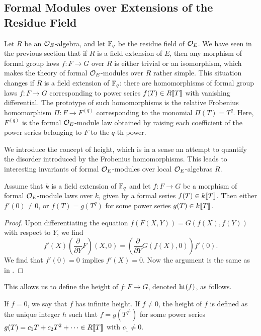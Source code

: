 \documentclass[../main.tex]{subfiles}
\begin{document}

\subsection{Formal Modules over Extensions of the Residue Field} %
\label{sub:Formal DVR-Modules over Fields}
Let $R$ be an $\mathcal{O}_E$-algebra, and let 
$\mathbb{F}_q$ be the residue field of $\mathcal{O}_E$. We have seen in the previous section
that if $R$ is a field extension of $E$,
then any morphism of formal group laws $f\colon  F \to G$ over $R$ is either trivial
or an isomorphism, which makes the theory of formal $\mathcal{O}_E$-modules over $R$ rather
simple. This situation changes if $R$ is a field extension of $\mathbb{F}_q$: there are
homomorphisms of formal group laws $f\colon F \to G$ corresponding to power
series $f(T) \in R \llbracket T \rrbracket$ with vanishing differential. The prototype of
such homomorphisms is the relative Frobenius homomorphism $\Pi \colon F \to
F^{(q)}$ corresponding to the monomial $\Pi(T) = T^q$. Here, $F^{(q)}$ is the
formal $\mathcal{O}_E$-module law obtained by raising each coefficient of the power series
belonging to $F$ to the $q$-th power.

We introduce the concept of height, which is in a sense an attempt to quantify
the disorder introduced by the Frobenius homomorphisms. This leads to
interesting invariants of formal $\mathcal{O}_E$-modules over local $\mathcal{O}_E$-algebras $R$.

\begin{lem}\label{lem:LemmaForDefOfHeight}
  Assume that $k$ is a field extension of $\mathbb{F}_q$ and let $f\colon  F \to G$ be a
  morphism of 
  formal $\mathcal{O}_E$-module laws over $k$, given by a formal series $f(T) \in
  k\llbracket T \rrbracket$. Then either $f'(0) \neq 0$, or 
  $f(T) = g(T^q)$ for some power series $g(T) \in k \llbracket T \rrbracket$.
\begin{proof}
  Upon differentiating the equation $f(F(X,Y)) = G(f(X), f(Y))$ with respect to 
  $Y$, we find
  \begin{equation*}
    f'(X) \left(\frac{\partial}{\partial Y}F\right)(X,0)
    =\left( \frac{\partial}{\partial Y}G(f(X), 0)\right) f'(0).
  \end{equation*}
  We find that $f'(0) = 0$ implies $f'(X) = 0$. 
  Now the argument is the same as in \cite[Lemma 4.1]{hopkins1994equivariant}.
\end{proof}
\end{lem}

This allows us to define the height of $f\colon F \to G$, denoted $\textnormal{ht}(f)$,
as follows.
\begin{defi}
  If $f = 0$, we say that $f$ has infinite height. 
  If $f \neq 0$, the height of $f$ is defined as the unique integer $h$ such that 
  $f = g(T^{q^h})$ for some power series $g(T) = c_1 T + c_2 T^2 + \dots \in
  R\llbracket T \rrbracket$ with $c_1 \neq 0$. 
\end{defi}
\end{document}
